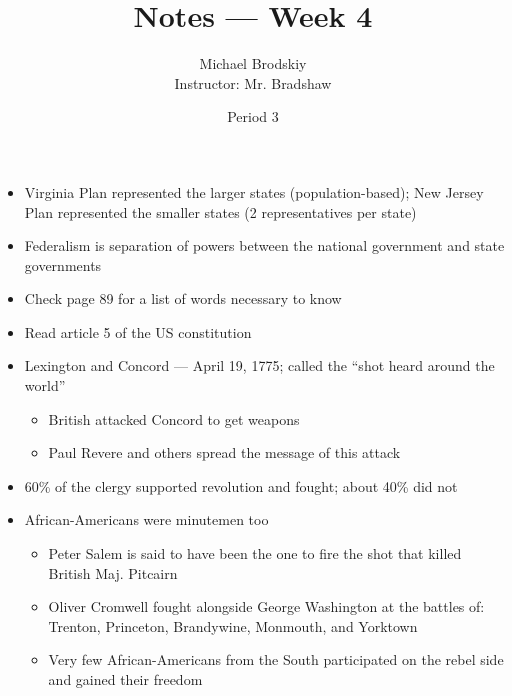 \documentclass[12pt]{article}
\title{Notes — Week 4}
\date{Period 3}
\author{Michael Brodskiy\\ \small Instructor: Mr. Bradshaw}
\begin{document}
\maketitle

\begin{itemize}

  \item Virginia Plan represented the larger states (population-based); New Jersey Plan represented the smaller states (2 representatives per state)

  \item Federalism is separation of powers between the national government and state governments

  \item Check page 89 for a list of words necessary to know

  \item Read article 5 of the US constitution

  \item Lexington and Concord — April 19, 1775; called the “shot heard around the world”

    \begin{itemize}

      \item British attacked Concord to get weapons

      \item Paul Revere and others spread the message of this attack

    \end{itemize}

  \item 60\% of the clergy supported revolution and fought; about 40\% did not

  \item African-Americans were minutemen too

    \begin{itemize}

      \item Peter Salem is said to have been the one to fire the shot that killed British Maj. Pitcairn

      \item Oliver Cromwell fought alongside George Washington at the battles of: Trenton, Princeton, Brandywine, Monmouth, and Yorktown

      \item Very few African-Americans from the South participated on the rebel side and gained their freedom


\end{itemize}
\end{itemize}
\end{document}

